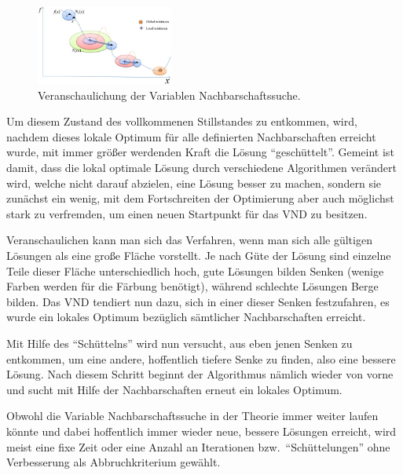 \begin{figure}
\vspace{-8mm}
\begin{center}
\includegraphics[width=0.4\textwidth]{../img/vns.jpg}
\end{center}
\vspace{-8mm}
\caption[Ein echter Raidl]{Veranschaulichung der Variablen Nachbarschaftssuche. \cite{Chen}}
\vspace{-8mm}
\end{figure}

Um diesem Zustand des vollkommenen Stillstandes zu entkommen, wird, nachdem dieses lokale Optimum für alle definierten Nachbarschaften erreicht wurde, mit immer größer werdenden Kraft die Lösung ``geschüttelt''. Gemeint ist damit, dass die lokal optimale Lösung durch verschiedene Algorithmen verändert wird, welche nicht darauf abzielen, eine Lösung besser zu machen, sondern sie zunächst ein wenig, mit dem Fortschreiten der Optimierung aber auch möglichst stark zu verfremden, um einen neuen Startpunkt für das VND zu besitzen.

Veranschaulichen kann man sich das Verfahren, wenn man sich alle gültigen Lösungen als eine große Fläche vorstellt. Je nach Güte der Lösung sind einzelne Teile dieser Fläche unterschiedlich hoch, gute Lösungen bilden Senken (wenige Farben werden für die Färbung benötigt), während schlechte Lösungen Berge bilden. Das VND tendiert nun dazu, sich in einer dieser Senken festzufahren, es wurde ein lokales Optimum bezüglich sämtlicher Nachbarschaften erreicht.

Mit Hilfe des ``Schüttelns'' wird nun versucht, aus eben jenen Senken zu entkommen, um eine andere, hoffentlich tiefere Senke zu finden, also eine bessere Lösung. Nach diesem Schritt beginnt der Algorithmus nämlich wieder von vorne und sucht mit Hilfe der Nachbarschaften erneut ein lokales Optimum.

Obwohl die Variable Nachbarschaftssuche in der Theorie immer weiter laufen könnte und dabei hoffentlich immer wieder neue, bessere Lösungen erreicht, wird meist eine fixe Zeit oder eine Anzahl an Iterationen bzw.\ ``Schüttelungen'' ohne Verbesserung als Abbruchkriterium gewählt.

